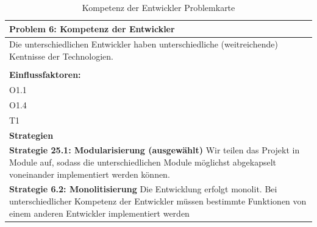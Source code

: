 \documentclass[fontsize=12pt,paper=a4,twoside]{scrartcl}
\begin{document}
\begin{table}[H]
    \centering
    \begin{tabular}{|p{15cm}|}
    \hline
          \textbf{Problem 6: Kompetenz der Entwickler}  \\ \hline
	Die unterschiedlichen Entwickler haben unterschiedliche (weitreichende) Kentnisse der Technologien. \\
         \\ \hline
          \textbf{Einflussfaktoren: } \\
	O1.1 \\
	O1.4 \\
	T1 \\
          \hline
          \textbf{Strategien} \\ \hline
            {}          
           \label{strategie:6.1}     
          \textbf{Strategie 25.1: Modularisierung (ausgewählt)} Wir teilen das Projekt in Module auf, sodass die unterschiedlichen Module möglichst abgekapselt voneinander implementiert werden können. \\        
  {}          
           \label{strategie:6.2}              
          \textbf{Strategie 6.2: Monolitisierung} Die Entwicklung erfolgt monolit. Bei unterschiedlicher Kompetenz der Entwickler müssen bestimmte Funktionen von einem anderen Entwickler implementiert werden \\
    \end{tabular}

    \caption{Kompetenz der Entwickler Problemkarte}
    \label{tab:ProblemKarte6}
\end{table}
\end{document}
